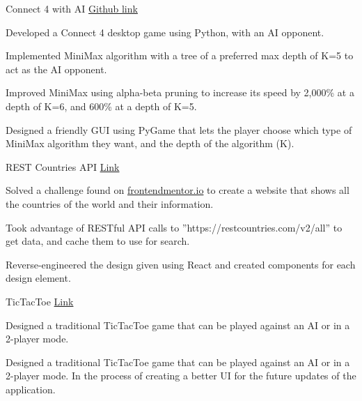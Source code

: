 

\begin{cventries}

  \cventry
    {} %
    {Connect 4 with AI	} %
    {\href{https://github.com/ad3ldev/Connect4-with-AI}{Github link}} %
    {} %
    {
      \begin{cvitems} %
        \item {Developed a Connect 4 desktop game using Python, with an AI opponent.}
        \item {Implemented MiniMax algorithm with a tree of a preferred max depth of K=5 to act as the AI opponent.}
        \item {Improved MiniMax using alpha-beta pruning to increase its speed by  2,000\% at a depth of K=6, and 600\% at a depth of K=5.}
        \item {Designed a friendly GUI using PyGame that lets the player choose which type of MiniMax algorithm they want, and the depth of the algorithm (K).}
      \end{cvitems}
    }
  \cventry
    {} %
    {REST Countries API} %
    {\href{https://ad3ldev.github.io/rest-countries-api}{Link}} %
    {} %
    {
      \begin{cvitems} %
        \item {Solved a challenge found on \href{frontendmentor.io}{frontendmentor.io} to create a website that shows all the countries of the world and their information.}
        \item {Took advantage of RESTful API calls to ”https://restcountries.com/v2/all” to get data, and cache them to use for search.}
        \item {Reverse-engineered the design given using React and created components for each design element.}
      \end{cvitems}
    }
  \cventry
    {} %
    {TicTacToe} %
    {\href{https://aadela-tictactoe-web.netlify.app}{Link}} %
    {} %
    {
      \begin{cvitems} %
        \item {Designed a traditional TicTacToe game that can be played against an AI or in a 2-player mode.}
        \item {Designed a traditional TicTacToe game that can be played against an AI or in a 2-player mode. In the process of creating a better UI for the future updates of the application.}
      \end{cvitems}
    }
\end{cventries}
